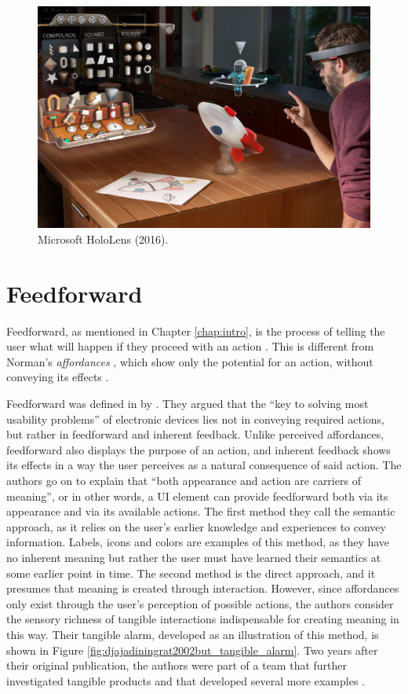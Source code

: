 \begin{figure}
    \centering
    \includegraphics[width=0.8\linewidth]{resources/introduction/hololens.jpg}
    \caption{Microsoft HoloLens (2016).}
    \label{fig:hololens}
\end{figure}

\section{Feedforward} \label{sec:relat:feedforward}
Feedforward, as mentioned in Chapter \ref{chap:intro}, is the process of telling the user what will happen if they proceed with an action \cite{djajadiningrat2002but}. This is different from Norman's \textit{affordances} \cite{norman2013design}, which show only the potential for an action, without conveying its effects \cite{chueke2016perceptible}.

Feedforward was defined in \citeyear{djajadiningrat2002but} by \citeauthor{djajadiningrat2002but} \cite{djajadiningrat2002but}. They argued that the ``key to solving most usability problems'' of electronic devices lies not in conveying required actions, but rather in feedforward and inherent feedback. Unlike perceived affordances, feedforward also displays the purpose of an action, and inherent feedback shows its effects in a way the user perceives as a natural consequence of said action. The authors go on to explain that ``both appearance and action are carriers of meaning'', or in other words, a UI element can provide feedforward both via its appearance and via its available actions. The first method they call the semantic approach, as it relies on the user's earlier knowledge and experiences to convey information. Labels, icons and colors are examples of this method, as they have no inherent meaning but rather the user must have learned their semantics at some earlier point in time. The second method is the direct approach, and it presumes that meaning is created through interaction. However, since affordances only exist through the user's perception of possible actions, the authors consider the sensory richness of tangible interactions indispensable for creating meaning in this way. Their tangible alarm, developed as an illustration of this method, is shown in Figure \ref{fig:djajadiningrat2002but_tangible_alarm}. Two years after their original publication, the authors were part of a team that further investigated tangible products and that developed several more examples \cite{djajadiningrat2004tangible}.

